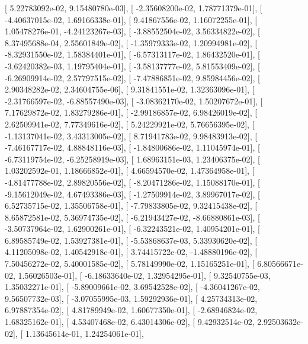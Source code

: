 \documentclass{article}
\begin{document}
       [  5.22783092e-02,   9.15480780e-03],
       [ -2.35608200e-02,   1.78771379e-01],
       [ -4.40637015e-02,   1.69166338e-01],
       [  9.41867556e-02,   1.16072255e-01],
       [  1.05478276e-01,  -4.24123267e-03],
       [ -3.88552504e-02,   3.56334822e-02],
       [  8.37495688e-04,   2.55601849e-02],
       [ -1.35979333e-02,   1.20994981e-02],
       [ -8.32931550e-02,   1.58384401e-01],
       [ -6.57313117e-02,   1.86432520e-01],
       [ -3.62420382e-03,   1.19795404e-01],
       [ -3.58137777e-02,   5.81553409e-02],
       [ -6.26909914e-02,   2.57797515e-02],
       [ -7.47886851e-02,   9.85984456e-02],
       [  2.90348282e-02,   2.34604755e-06],
       [  9.31841551e-02,   1.32363096e-01],
       [ -2.31766597e-02,  -6.88557490e-03],
       [ -3.08362170e-02,   1.50207672e-01],
       [  7.17629872e-02,   1.83279286e-01],
       [ -2.99186857e-02,   6.98426019e-02],
       [  2.62509941e-02,   7.77349616e-02],
       [  5.24229921e-02,   5.76656395e-02],
       [ -1.13137041e-02,   3.43313005e-02],
       [  8.71941783e-02,   9.98483913e-02],
       [ -7.46167717e-02,   4.88848116e-03],
       [ -1.84800686e-02,   1.11045974e-01],
       [ -6.73119754e-02,  -6.25258919e-03],
       [  1.68963151e-03,   1.23406375e-02],
       [  1.03202592e-01,   1.18666852e-01],
       [  4.66594570e-02,   1.47364958e-01],
       [ -4.81477788e-02,   2.89820556e-02],
       [ -8.20471286e-02,   1.15088170e-01],
       [ -9.15612049e-02,   4.67493386e-03],
       [ -1.27509914e-02,   3.89967017e-02],
       [  6.52735715e-02,   1.35506758e-01],
       [ -7.79833805e-02,   9.32415438e-02],
       [  8.65872581e-02,   5.36974735e-02],
       [ -6.21943427e-02,  -8.66880861e-03],
       [ -3.50737964e-02,   1.62900261e-01],
       [ -6.32243521e-02,   1.40954201e-01],
       [  6.89585749e-02,   1.53927381e-01],
       [ -5.53868637e-03,   5.33930620e-02],
       [  4.11205098e-02,   1.40542918e-01],
       [  3.74415722e-02,  -1.48880196e-02],
       [  7.50456272e-02,   5.40001585e-02],
       [  5.78149990e-02,   1.15165251e-01],
       [  6.80566671e-02,   1.56026503e-01],
       [ -6.18633640e-02,   1.32954295e-01],
       [  9.32540755e-03,   1.35032271e-01],
       [ -5.89009661e-02,   3.69542528e-02],
       [ -4.36041267e-02,   9.56507732e-03],
       [ -3.07055995e-03,   1.59292936e-01],
       [  4.25734313e-02,   6.97887354e-02],
       [  4.81789949e-02,   1.60677350e-01],
       [ -2.68946824e-02,   1.68325162e-01],
       [  4.53407468e-02,   6.43014306e-02],
       [  9.42932514e-02,   2.92503632e-02],
       [  1.13645614e-01,   1.24254061e-01],
\end{document}
